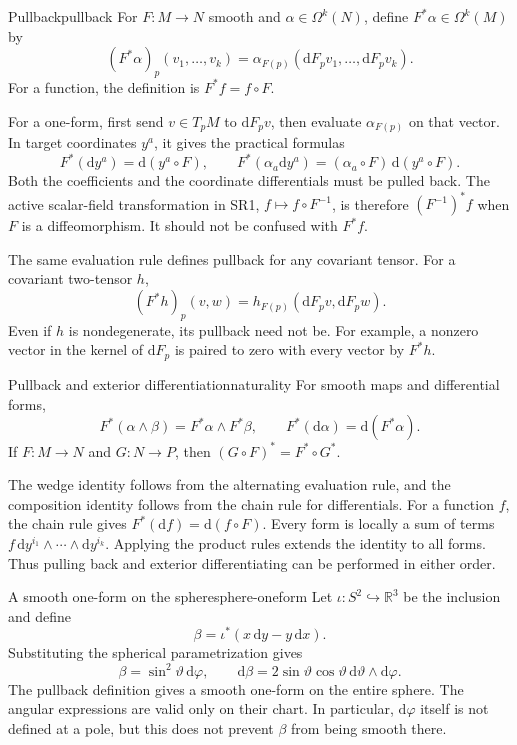 \documentclass[11pt,a4paper]{article}
\numberwithin{equation}{section}
\newcommand{\R}{\mathbb R}
\newcommand{\dd}{\mathrm d}
\begin{document}
\begin{definition}{Pullback}{pullback}
For \(F:M\to N\) smooth and \(\alpha\in\Omega^k(N)\), define
\(F^*\alpha\in\Omega^k(M)\) by
\[
 (F^*\alpha)_p(v_1,\ldots,v_k)
 =\alpha_{F(p)}(\dd F_pv_1,\ldots,\dd F_pv_k).
\]
For a function, the definition is \(F^*f=f\circ F\).
\end{definition}

For a one-form, first send \(v\in T_pM\) to \(\dd F_pv\), then
evaluate \(\alpha_{F(p)}\) on that vector. In target coordinates \(y^a\), it gives the practical
formulas
\[
 F^*(\dd y^a)=\dd(y^a\circ F),\qquad
 F^*(\alpha_a\dd y^a)=(\alpha_a\circ F)\,\dd(y^a\circ F).
\]
Both the coefficients and the coordinate differentials must be pulled
back. The active scalar-field transformation in SR1,
\(f\mapsto f\circ F^{-1}\), is therefore \((F^{-1})^*f\) when
\(F\) is a diffeomorphism. It should not be confused with \(F^*f\).

The same evaluation rule defines pullback for any covariant tensor.
For a covariant two-tensor \(h\),
\[
 (F^*h)_p(v,w)=h_{F(p)}(\dd F_pv,\dd F_pw).
\]
Even if \(h\) is nondegenerate, its pullback need not be. For example,
a nonzero vector in the kernel of \(\dd F_p\) is paired to zero with
every vector by \(F^*h\).

\begin{proposition}{Pullback and exterior differentiation}{naturality}
For smooth maps and differential forms,
\[
 F^*(\alpha\wedge\beta)=F^*\alpha\wedge F^*\beta,
 \qquad F^*(\dd\alpha)=\dd(F^*\alpha).
\]
If \(F:M\to N\) and \(G:N\to P\), then
\((G\circ F)^*=F^*\circ G^*\).
\end{proposition}

The wedge identity follows from the alternating evaluation rule, and
the composition identity follows from the chain rule for differentials.
For a function \(f\), the chain rule gives
\(F^*(\dd f)=\dd(f\circ F)\). Every form is locally a sum of terms
\(f\,\dd y^{i_1}\wedge\cdots\wedge\dd y^{i_k}\). Applying the
product rules extends the identity to all forms. Thus pulling back
and exterior differentiating can be performed in either order.

\begin{examplebox}{A smooth one-form on the sphere}{sphere-oneform}
Let \(\iota:S^2\hookrightarrow\R^3\) be the inclusion and define
\[
 \beta=\iota^*(x\,\dd y-y\,\dd x).
\]
Substituting the spherical parametrization gives
\[
 \beta=\sin^2\vartheta\,\dd\varphi,\qquad
 \dd\beta=2\sin\vartheta\cos\vartheta\,
                \dd\vartheta\wedge\dd\varphi.
\]
The pullback definition gives a smooth one-form on the entire sphere.
The angular expressions are valid only on their chart. In particular,
\(\dd\varphi\) itself is not defined at a pole, but this does not
prevent \(\beta\) from being smooth there.
\end{examplebox}
\end{document}
